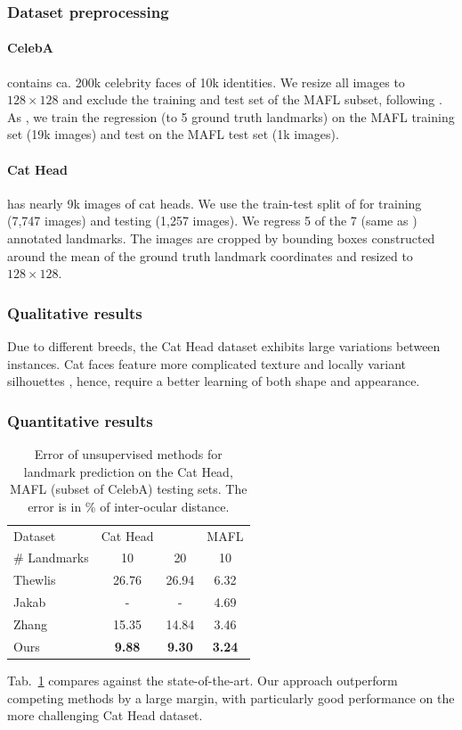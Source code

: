 		\subsubsection{Dataset preprocessing}
			\paragraph{CelebA} \cite{liu15facewild} contains ca. 200k celebrity faces of 10k identities.
			We resize all images to $128\times 128$ and exclude the training and test set of the MAFL subset, following \cite{thewlis17}.
			As  \cite{thewlis17, zhang18}, we train the regression (to 5 ground truth landmarks) on the MAFL training set (19k images) and test on the MAFL test set (1k images).

			\paragraph{Cat Head} \cite{zhang08cathead}  has nearly 9k images of cat heads.
			We use the train-test split of \cite{zhang18} for training (7,747 images) and testing (1,257 images).
			We regress 5 of the 7 (same as \cite{zhang18}) annotated landmarks.
			The images are cropped by bounding boxes constructed around the mean of the ground truth landmark coordinates and resized to $128\times128$.

		\subsubsection{Qualitative results}
			Due to different breeds, the Cat Head dataset exhibits large variations between instances. Cat faces feature more complicated texture and locally variant silhouettes \cite{zhang08cathead}, hence, require a better learning of both shape and appearance.

		\subsubsection{Quantitative results}
			\begin{table}[t]
				\caption{Error of unsupervised methods for landmark prediction on the Cat Head, MAFL (subset of CelebA) testing sets. The error is in \% of inter-ocular distance.}
				\label{tab:faces}
				\centering
				\begin{tabular}{l|ccc}
				\hline
				Dataset & Cat Head &  & MAFL \\
				  \# Landmarks &10 & 20  & 10  \\
				  \hline
				 Thewlis \cite{thewlis17}
				 & 26.76 & 26.94 & 6.32    \\
				 Jakab \cite{jakab18}
				 & - & - & 4.69  \\
				 Zhang \cite{zhang18}
				 & 15.35 & 14.84 & 3.46  \\
				  Ours & \textbf{9.88}  & \textbf{9.30} & \textbf{3.24}  \\ \hline  %
				\end{tabular}
			\end{table}
			Tab.~\ref{tab:faces} compares against the state-of-the-art.
			Our approach outperform competing methods by a large margin, with particularly good performance on the more challenging Cat Head dataset.
